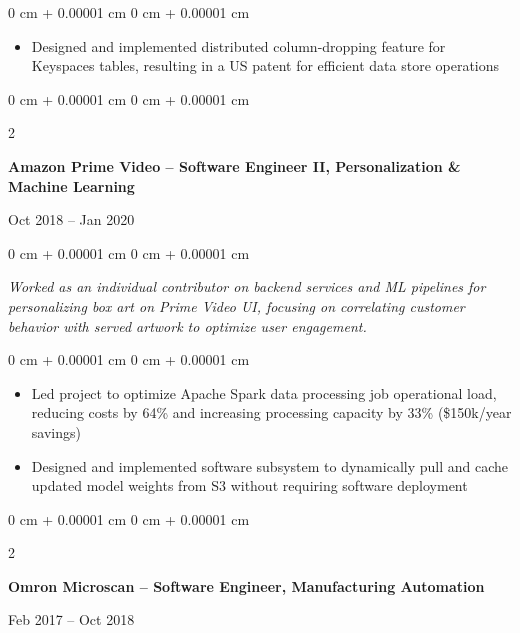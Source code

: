 \documentclass[10pt, letterpaper]{article}
\newenvironment{highlights}{
    \begin{itemize}[
        topsep=0.10 cm,
        parsep=0.10 cm,
        partopsep=0pt,
        itemsep=0pt,
        leftmargin=0 cm + 10pt
    ]
}{
    \end{itemize}
} %
\newenvironment{onecolentry}{
    \begin{adjustwidth}{
        0 cm + 0.00001 cm
    }{
        0 cm + 0.00001 cm
    }
}{
    \end{adjustwidth}
} %
\newenvironment{twocolentry}[2][]{
    \onecolentry
    \def\secondColumn{#2}
    \setcolumnwidth{\fill, 4.5 cm}
    \begin{paracol}{2}
}{
    \switchcolumn \raggedleft \secondColumn
    \end{paracol}
    \endonecolentry
} %
\begin{document}
        \vspace{0.05 cm}
        \begin{onecolentry}
            \begin{highlights}
                \item Designed and implemented distributed column-dropping feature for Keyspaces tables, resulting in a US patent for efficient data store operations
            \end{highlights}
        \end{onecolentry}

        \vspace{0.2 cm}

        \begin{twocolentry}{
            Oct 2018 – Jan 2020
        }
            \textbf{Amazon Prime Video -- Software Engineer II, Personalization \& Machine Learning}
        \end{twocolentry}

        \vspace{0.05 cm}
        \begin{onecolentry}
            \textit{Worked as an individual contributor on backend services and ML pipelines for personalizing box art on Prime Video UI, focusing on correlating customer behavior with served artwork to optimize user engagement.}
        \end{onecolentry}

        \vspace{0.05 cm}
        \begin{onecolentry}
            \begin{highlights}
                \item Led project to optimize Apache Spark data processing job operational load, reducing costs by 64\% and increasing processing capacity by 33\% (\$150k/year savings)
                \item Designed and implemented software subsystem to dynamically pull and cache updated model weights from S3 without requiring software deployment
            \end{highlights}
        \end{onecolentry}

        \vspace{0.2 cm}

        \begin{twocolentry}{
            Feb 2017 – Oct 2018
        }
            \textbf{Omron Microscan – Software Engineer, Manufacturing Automation}
        \end{twocolentry}
\end{document}
